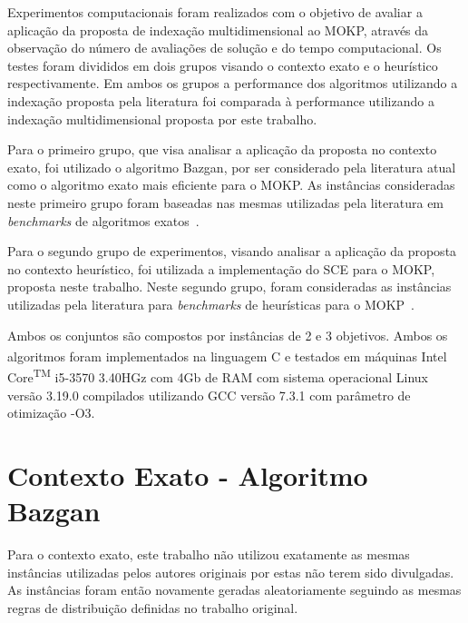 Experimentos computacionais foram realizados com o objetivo de avaliar a
aplicação da proposta de indexação multidimensional ao MOKP,
através da observação do número de avaliações de solução e do tempo computacional.
Os testes foram divididos em dois grupos visando o contexto
exato e o heurístico respectivamente.
Em ambos os grupos a performance dos algoritmos utilizando a
indexação proposta pela literatura foi comparada à performance utilizando a
indexação multidimensional proposta por este trabalho.

Para o primeiro grupo, que visa analisar a aplicação da proposta no contexto exato,
foi utilizado o algoritmo Bazgan, por ser considerado pela literatura atual como
o algoritmo exato mais eficiente para o MOKP.
As instâncias consideradas neste primeiro grupo foram baseadas nas mesmas
utilizadas pela literatura em \emph{benchmarks} de algoritmos exatos~\cite{bazgan2009, figueira2013algorithmic, correia2018}.

Para o segundo grupo de experimentos, visando analisar a aplicação da proposta
no contexto heurístico, foi utilizada a implementação do SCE para o MOKP, proposta neste trabalho.
Neste segundo grupo, foram consideradas as instâncias utilizadas
pela literatura para \emph{benchmarks} de heurísticas para o MOKP~\cite{zitzler1998multiobjective,zitzler2001spea2, deb2002fast, zhang2007moea, zouache2018cooperative}.

Ambos os conjuntos são compostos por instâncias de 2 e 3 objetivos.
Ambos os algoritmos foram implementados na linguagem C e testados em
máquinas Intel\textsuperscript{\textregistered} Core\textsuperscript{TM} i5-3570 3.40HGz
com 4Gb de RAM com sistema operacional Linux versão 3.19.0 compilados utilizando
GCC versão 7.3.1 com parâmetro de otimização -O3.

\section{Contexto Exato - Algoritmo Bazgan}

Para o contexto exato, este trabalho não utilizou exatamente as mesmas instâncias utilizadas
pelos autores originais por estas não terem sido divulgadas.
As instâncias foram então novamente geradas aleatoriamente seguindo as mesmas regras de
distribuição definidas no trabalho original.


